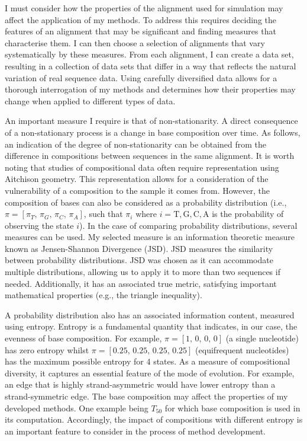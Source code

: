 I must consider how the properties of the alignment used for simulation may affect the application of my methods. To address this requires deciding the features of an alignment that may be significant and finding measures that characterise them. I can then choose a selection of alignments that vary systematically by these measures. From each alignment, I can create a data set, resulting in a collection of data sets that differ in a way that reflects the natural variation of real sequence data. Using carefully diversified data allows for a thorough interrogation of my methods and determines how their properties may change when applied to different types of data.

An important measure I require is that of non-stationarity. A direct consequence of a non-stationary process is a change in base composition over time. As follows, an indication of the degree of non-stationarity can be obtained from the difference in compositions between sequences in the same alignment. It is worth noting that studies of compositional data often require representation using Aitchison geometry. This representation allows for a consideration of the vulnerability of a composition to the sample it comes from. However, the composition of bases can also be considered as a probability distribution (i.e., $\pi = [\pi_T,\, \pi_G, \, \pi_C, \, \pi_A]$, such that $\pi_i$ where $i= \mathrm{T}, \mathrm{G}, \mathrm{C}, \mathrm{A}$ is the probability of observing the state $i$). In the case of comparing probability distributions, several measures can be used. My selected measure is an information theoretic measure known as Jensen-Shannon Divergence (JSD). JSD measures the similarity between probability distributions. JSD was chosen as it can accommodate multiple distributions, allowing us to apply it to more than two sequences if needed. Additionally, it has an associated true metric, satisfying important mathematical properties (e.g., the triangle inequality). 

A probability distribution also has an associated information content, measured using entropy. Entropy is a fundamental quantity that indicates, in our case, the evenness of base composition. For example, $\pi =[1,\, 0,\, 0,\, 0]$  (a single nucleotide) has zero entropy whilst  $\pi =[0.25,\, 0.25,\, 0.25,\, 0.25]$ (equifrequent nucleotides) has the maximum possible entropy for 4 states. As a measure of compositional diversity, it captures an essential feature of the mode of evolution. For example, an edge that is highly \gls{strand-asymmetric} would have lower entropy than a \gls{strand-symmetric} edge. The base composition may affect the properties of my developed methods. One example being $T_{50}$ for which base composition is used in its computation. Accordingly, the impact of compositions with different entropy is an important feature to consider in the process of method development.

